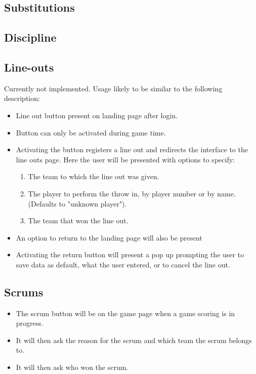 \documentclass[hidelinks,a4paper,12pt]{article}
\begin{document}
	\subsection{Substitutions}
	
	\subsection{Discipline}

	\subsection{Line-outs}
	Currently not implemented. Usage likely to be similar to the following description:
	\begin{itemize}
		\item Line out button present on landing page after login.
		\item Button can only be activated during game time.
		\item Activating the button registers a line out and redirects the interface to the line outs page. Here the user will be presented with options to specify:
			\begin{enumerate}
				\item The team to which the line out was given.
				\item The player to perform the throw in, by player number or by name. (Defaults to "unknown player").
				\item The team that won the line out.
			\end{enumerate}
		\item An option to return to the landing page will also be present
		\item Activating the return button will present a pop up prompting the user to save data as default, what the user entered, or to cancel the line out.
	\end{itemize}

	\subsection{Scrums}
		\begin{itemize}
			\item The scrum button will be on the game page when a game scoring is in progress.
			\item It will then ask the reason for the scrum and which team the scrum belongs to.
			\item It will then ask who won the scrum.
		\end{itemize}
		
\end{document}
